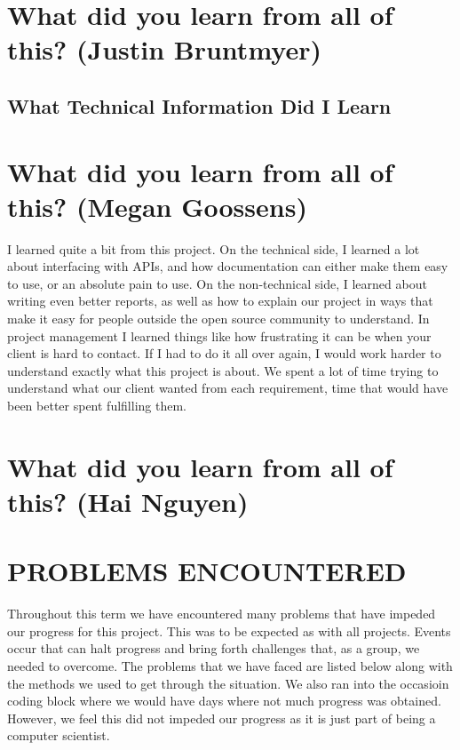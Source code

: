 \documentclass[draftclsnofoot,10pt,onecolumn]{IEEEtran} %
\begin{document}
\section{What did you learn from all of this? (Justin Bruntmyer)}

\subsection{What Technical Information Did I Learn}



\section{What did you learn from all of this? (Megan Goossens)}
I learned quite a bit from this project. On the technical side, I learned a lot
about interfacing with APIs, and how documentation can either make them easy to
use, or an absolute pain to use. On the non-technical side, I learned about
writing even better reports, as well as how to explain our project in ways that
make it easy for people outside the open source community to understand.  In
project management I learned things like how frustrating it can be when your
client is hard to contact. If I had to do it all over again, I would work harder
to understand exactly what this project is about. We spent a lot of time trying
to understand what our client wanted from each requirement, time that would have
been better spent fulfilling them.

\section{What did you learn from all of this? (Hai Nguyen)}


\section{PROBLEMS ENCOUNTERED}

Throughout this term we have encountered many problems that have impeded our
progress for this project. This was to be expected as with all projects.  Events
occur that can halt progress and bring forth challenges that, as a group, we
needed to overcome. The problems that we have faced are listed below along with
the methods we used to get through the situation. We also ran into the occasioin
coding block where we would have days where not much progress was obtained.
However, we feel this did not impeded our progress as it is just part of being a
computer scientist.
\end{document}
